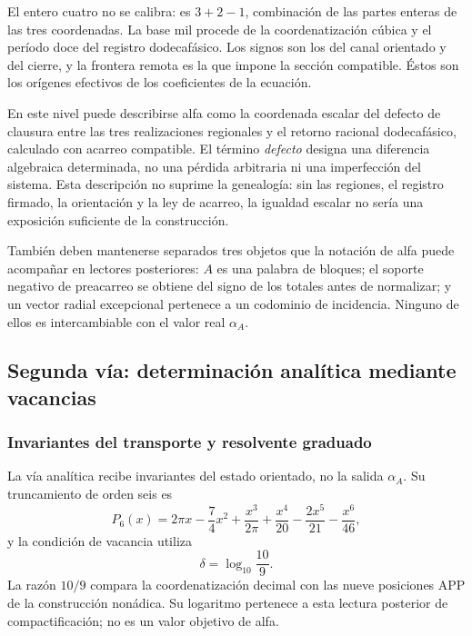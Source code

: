 El entero cuatro no se calibra: es
\(3+2-1\), combinación de las partes enteras de las tres coordenadas.
La base mil procede de la coordenatización cúbica y el período doce del registro dodecafásico. Los
signos son los del canal orientado y del cierre, y la frontera remota es
la que impone la sección compatible. Éstos son los orígenes efectivos de
los coeficientes de la ecuación.

En este nivel puede describirse alfa como la coordenada escalar del
defecto de clausura entre las tres realizaciones regionales y el retorno
racional dodecafásico, calculado con acarreo compatible. El término
\emph{defecto} designa una diferencia algebraica determinada, no una
pérdida arbitraria ni una imperfección del sistema. Esta descripción no
suprime la genealogía: sin las regiones, el registro firmado, la
orientación y la ley de acarreo, la igualdad escalar no sería una
exposición suficiente de la construcción.

También deben mantenerse separados tres objetos que la notación de alfa
puede acompañar en lectores posteriores: \(A\) es una palabra de
bloques; el soporte negativo de preacarreo se obtiene del signo de los
totales antes de normalizar; y un vector radial excepcional pertenece a
un codominio de incidencia. Ninguno de ellos es intercambiable con el
valor real \(\alpha_A\).






\subsection{Segunda vía: determinación analítica mediante vacancias}
\subsubsection{Invariantes del transporte y resolvente graduado}
\label{subsec:alpha-via-b}

La vía analítica recibe invariantes del estado orientado, no la salida
\(\alpha_A\). Su truncamiento de orden seis es
\begin{equation}
 P_6(x)=2\pi x-\frac74x^2
 +\frac{x^3}{2\pi}
 +\frac{x^4}{20}-\frac{2x^5}{21}-\frac{x^6}{46},
 \label{eq:alpha-p6}
\end{equation}
y la condición de vacancia utiliza
\[
 \delta=\log_{10}\frac{10}{9}.
\]
La razón \(10/9\) compara la coordenatización decimal con las nueve posiciones
APP de la construcción nonádica. Su logaritmo pertenece a esta lectura
posterior de compactificación; no es un valor objetivo de alfa.

